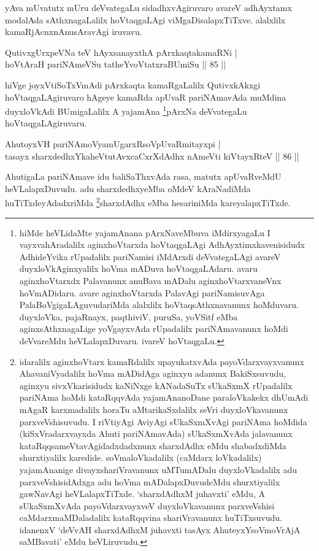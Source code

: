 \begin{artha}
yAva mUvatutx mUru deVvategaLu sidadhxvAgiruvaro avareV adhAyxtamx 
modalAda sAthxnagaLalilx hoVtaqgaLAgi viMgaDisalapxTiTxve. alalxlilx 
kamaRjAcnxnAnusAravAgi iruvavu.
\end{artha}

\begin{shl}
QutivxgUrxpeVNa teV hAyxsanayxthA pArxkaqtakamaRNi | \\
hoVtAraH pariNAmeVSu tatheYvoVtatxraBUmiSu \hfill|| 85 || 
\end{shl}

\begin{artha}
hiVge joyxVtiSoTxVmAdi pArxkaqta kamaRgaLalilx QutivxkAkxgi 
hoVtaqgaLAgiruvaro hAgeye kamaRda apUvaR pariNAmavAda muMdina 
duyxloVkAdi BUmigaLalilx A yajamAna \footnote[1]{hiMde heVLidaMte 
yajamAnana pArxNaveMbuva iMdirxyagaLu I vayxvahAradalilx 
aginxhoVtarxda hoVtaqgaLAgi AdhAyxtimxkavenisidudx AdhideYvika 
rUpadalilx pariNamisi iMdArxdi deVvategaLAgi avareV duyxloVkAginxyalilx 
hoVma mADuva hoVtaqgaLAdaru. avaru aginxhoVtarxdx Palavanunx anuBava 
mADalu aginxhoVtarxvaneVnx hoVmADidaru. avare aginxhoVtarxda PalavAgi 
pariNamisuvAga PalaBoVgigaLAguvudariMda alalxlilx hoVtaqsAthxnavanunx 
hoMduvaru. duyxloVka, pajaRnayx, paqthiviV, puruSa, yoVSitf eMba 
aginxsAthxnagaLige yoVgayxvAda rUpadalilx pariNAmavanunx hoMdi 
deVvareMdu heVLalapxDuvaru. ivareV hoVtaqgaLu.}pArxNa deVvategaLu 
hoVtaqgaLAgiruvaru.
\end{artha}


\begin{shl}
AhutoyxVH pariNAmoV\s yamUgarxRsoV\s pUvaRmitayxpi | \\
tasayx sharxdedhxYkaheVtutAvxcaCxrXdAdhx nAmeVti kiVtayxRteV \hfill|| 86 || 
\end{shl}

\begin{artha}
AhutigaLa pariNAmave idu baliSaThxvAda rasa, matutx apUvaRveMdU heVLalapxDuvudu. adu sharxdedhxyeMba oMdeV kAraNadiMda huTiTxdeyAdadxriMda \footnote[2]{idaralilx aginxhoVtarx kamaRdalilx upayukatxvAda payoVdarxvayxvanunx AhavaniVyadalilx hoVma mADidAga aginxyu adanunx BakiSxsuvudu, aginxyu sivxVkarisidudx kaNiNxge kANadaSuTx sUkaSxmX rUpadalilx pariNAma hoMdi kataRqqvAda yajamAnanoDane paraloVkakekx dhUmAdi mAgaR karxmadalilx horaTu aMtarikaSxdalilx seVri duyxloVkavanunx parxveVshisuvudu. I riVtiyAgi AviyAgi sUkaSxmXvAgi pariNAma hoMdida (kiSxVradarxvayxda Ahuti pariNAmavAda) sUkaSxmXvAda jalavanunx kataRqqsameVtavAgidadxdadxnunx sharxdAdhx eMdu shabadxdiMda shurxtiyalilx karedide. soVmaloVkadalilx (caMdarx loVkadalilx) yajamAnanige divayxshariVravanunx uMTumADalu duyxloVkadalilx adu parxveVshisidAdxga adu hoVma mADalapxDuvudeMdu shurxtiyalilx gawNavAgi heVLalapxTiTxde. `sharxdAdhxM juhavxti' eMdu, A sUkaSxmXvAda payoVdarxvayxveV duyxloVkavanunx parxveVshisi caMdarxmaMDaladalilx kataRqqvina shariVravanunx huTiTxsuvudu. idanenxV `deVvAH sharxdAdhxM juhavxti tasAyx AhuteyxYsoVmoVrAjA saMBavati' eMdu heVLiruvudu.}sharxdAdhx eMba hesariniMda kareyalapxTiTxde.
\end{artha}

